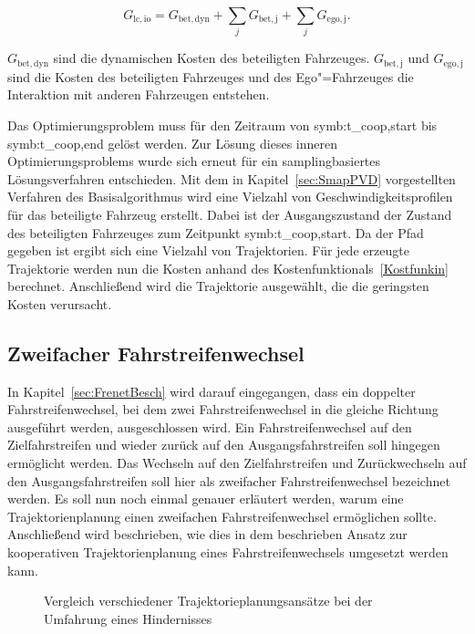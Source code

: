 \begin{equation}
\label{Kostfunkin}
	G_\mathrm{lc,io} = G_\mathrm{bet,dyn} + \sum_j G_\mathrm{bet,j} + \sum_j G_\mathrm{ego,j}.
\end{equation}

\(G_\mathrm{bet,dyn}\) sind die dynamischen Kosten des beteiligten Fahrzeuges. \(G_\mathrm{bet,j}\) und \(G_\mathrm{ego,j}\) sind die Kosten des beteiligten Fahrzeuges und des Ego"=Fahrzeuges die Interaktion mit anderen Fahrzeugen entstehen.

Das Optimierungsproblem muss f\"ur den Zeitraum von \gls{symb:t_coop,start} bis \gls{symb:t_coop,end} gel\"ost werden.
Zur L\"osung dieses inneren Optimierungsproblems wurde sich erneut f\"ur ein samplingbasiertes L\"osungsverfahren entschieden.
Mit dem in Kapitel~\ref{sec:SmapPVD} vorgestellten Verfahren des Basisalgorithmus wird eine Vielzahl von Geschwindigkeitsprofilen f\"ur das beteiligte Fahrzeug erstellt.
Dabei ist der Ausgangszustand der Zustand des beteiligten Fahrzeuges zum Zeitpunkt \gls{symb:t_coop,start}.
Da der Pfad gegeben ist ergibt sich eine Vielzahl von Trajektorien.
F\"ur jede erzeugte Trajektorie werden nun die Kosten anhand des Kostenfunktionals~\ref{Kostfunkin} berechnet.
Anschlie{\ss}end wird die Trajektorie ausgew\"ahlt, die die geringsten Kosten verursacht.


\subsection{Zweifacher Fahrstreifenwechsel}
In Kapitel~\ref{sec:FrenetBesch} wird darauf eingegangen, dass ein doppelter Fahrstreifenwechsel, bei dem zwei Fahrstreifenwechsel in die gleiche Richtung ausgef\"uhrt werden, ausgeschlossen wird.
Ein Fahrstreifenwechsel auf den Zielfahrstreifen und wieder zur\"uck auf den Ausgangsfahrstreifen soll hingegen erm\"oglicht werden.
Das Wechseln auf den Zielfahrstreifen und Zur\"uckwechseln auf den Ausgangsfahrstreifen soll hier als zweifacher Fahrstreifenwechsel bezeichnet werden.
Es soll nun noch einmal genauer erl\"autert werden, warum eine Trajektorienplanung einen zweifachen Fahrstreifenwechsel erm\"oglichen sollte.
Anschlie{\ss}end wird beschrieben, wie dies in dem beschrieben Ansatz zur kooperativen Trajektorienplanung eines Fahrstreifenwechsels umgesetzt werden kann.

\begin{figure}[!htbp]
    \centering
    \hfill
    \caption[Zweifacher Fahrstreifenwechsel]{Vergleich verschiedener Trajektorieplanungsans\"atze bei der Umfahrung eines Hindernisses \cite{Ziegler2017}}
    \label{fig:zweiSpurwech}
\end{figure}

